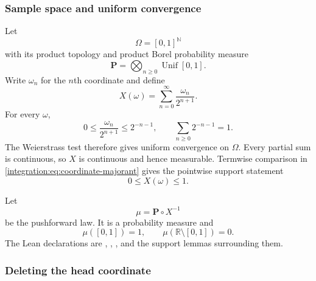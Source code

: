 \documentclass[11pt,oneside]{article}
\theoremstyle{definition}
\theoremstyle{remark}
\newcommand{\R}{\mathbb R}
\newcommand{\N}{\mathbb N}
\begin{document}
\subsubsection{Sample space and uniform convergence}

Let
\begin{equation}
 \Omega=[0,1]^{\N}
 \label{integration:eq:sample-space}
\end{equation}
with its product topology and product Borel probability measure
\begin{equation}
 \mathbf P=\bigotimes_{n\ge0}\operatorname{Unif}[0,1].
 \label{integration:eq:uniform-product}
\end{equation}
Write $\omega_n$ for the $n$th coordinate and define
\begin{equation}
 X(\omega)=\sum_{n=0}^{\infty}\frac{\omega_n}{2^{n+1}}.
 \label{integration:eq:weighted-coordinate-sum}
\end{equation}
For every $\omega$,
\begin{equation}
 0\le \frac{\omega_n}{2^{n+1}}\le2^{-n-1},
 \qquad
 \sum_{n\ge0}2^{-n-1}=1.
 \label{integration:eq:coordinate-majorant}
\end{equation}
The Weierstrass test therefore gives uniform convergence on $\Omega$.  Every partial sum is
continuous, so $X$ is continuous and hence measurable.  Termwise comparison in
\eqref{integration:eq:coordinate-majorant} gives the pointwise support statement
\begin{equation}
 0\le X(\omega)\le1.
 \label{integration:eq:X-support}
\end{equation}

Let
\begin{equation}
 \mu=\mathbf P\circ X^{-1}
 \label{integration:eq:weighted-sum-law}
\end{equation}
be the pushforward law.  It is a probability measure and
\begin{equation}
 \mu([0,1])=1,
 \qquad
 \mu(\R\setminus[0,1])=0.
 \label{integration:eq:law-support}
\end{equation}
The Lean declarations are ,
, , and the support
lemmas surrounding them.

\subsubsection{Deleting the head coordinate}
\end{document}
